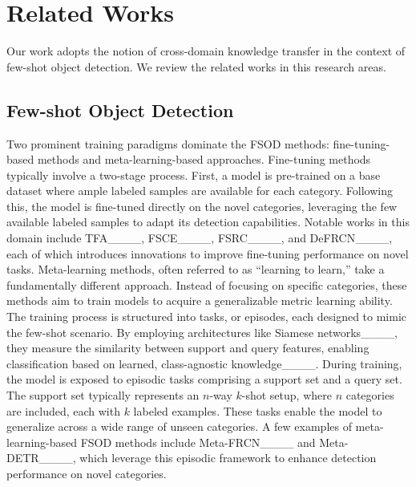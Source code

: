 \section{Related Works}
\label{Related Works}

Our work adopts the notion of cross-domain knowledge transfer in the context of few-shot object detection. We review the related works in this research areas.

\subsection{Few-shot Object Detection}
\label{sec:FSOD}

 

Two prominent training paradigms dominate the FSOD methods: fine-tuning-based methods and meta-learning-based approaches. Fine-tuning methods typically involve a two-stage process. First, a model is pre-trained on a base dataset where ample labeled samples are available for each category. Following this, the model is fine-tuned directly on the novel categories, leveraging the few available labeled samples to adapt its detection capabilities. Notable works in this domain include TFA____, FSCE____, FSRC____, and DeFRCN____, each of which introduces innovations to improve fine-tuning performance on novel tasks.
Meta-learning methods, often referred to as ``learning to learn,'' take a fundamentally different approach. Instead of focusing on specific categories, these methods aim to train models to acquire a generalizable metric learning ability. The training process is structured into tasks, or episodes, each designed to mimic the few-shot scenario. By employing architectures like Siamese networks____, they measure the similarity between support and query features, enabling classification based on learned, class-agnostic knowledge____. During training, the model is exposed to episodic tasks comprising a support set and a query set. The support set typically represents an \(n\)-way \(k\)-shot setup, where \(n\) categories are included, each with \(k\) labeled examples. These tasks enable the model to generalize across a wide range of unseen categories. 
A few examples of meta-learning-based FSOD methods include Meta-FRCN____ and Meta-DETR____, which leverage this episodic framework to enhance detection performance on novel categories.  

